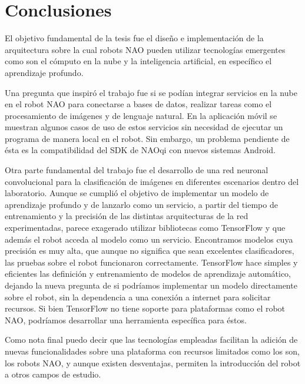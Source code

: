 \chapter*{Conclusiones}
\label{\detokenize{conclusion:cloudnao-una-arquitectura-de-software-para-la-integracion-de-computo-en-la-nube-con-robots-nao}}\label{\detokenize{conclusion:conclusion}}\label{\detokenize{conclusion::doc}}


El objetivo fundamental de la tesis fue el diseño e implementación de
la arquitectura sobre la cual robots NAO pueden
utilizar tecnologías emergentes como son el cómputo en la nube y
la inteligencia artificial, en específico el aprendizaje profundo.

Una pregunta que inspiró el trabajo
fue si se podían integrar servicios en la nube
en el robot NAO para conectarse a bases de datos, realizar tareas como el procesamiento de imágenes y de lenguaje natural. En la aplicación
móvil se muestran algunos casos de uso de estos servicios
sin necesidad de ejecutar un programa de manera local
en el robot. Sin embargo, un problema pendiente de ésta
es la compatibilidad del SDK de NAOqi con nuevos sistemas
Android.

Otra parte fundamental del trabajo fue el desarrollo
de una red neuronal convolucional para la clasificación
de imágenes en diferentes escenarios dentro del laboratorio.
Aunque se cumplió el objetivo de implementar un modelo
de aprendizaje profundo y de lanzarlo como un servicio, 
a partir del tiempo de entrenamiento y la precisión de las
distintas arquitecturas de la red experimentadas,
parece exagerado utilizar bibliotecas como TensorFlow 
y que además el robot acceda al modelo como
un servicio.
Encontramos modelos
cuya precisión es muy alta, que aunque no significa que sean excelentes clasificadores,
las pruebas sobre el robot funcionaron correctamente.
TensorFlow hace simples y eficientes
las definición y entrenamiento de modelos de aprendizaje automático,
dejando la nueva pregunta de si podríamos implementar un modelo 
directamente sobre el robot, sin la dependencia a una conexión
a internet para solicitar recursos. Si bien TensorFlow
no tiene soporte para plataformas como el robot NAO, podríamos
desarrollar una herramienta específica para éstos. 

Como nota final puedo decir que las tecnologías empleadas
facilitan la adición
de nuevas funcionalidades sobre una plataforma con recursos
limitados como los son, los robots NAO, y aunque existen desventajas,
permiten la introducción
del robot a otros campos de estudio.